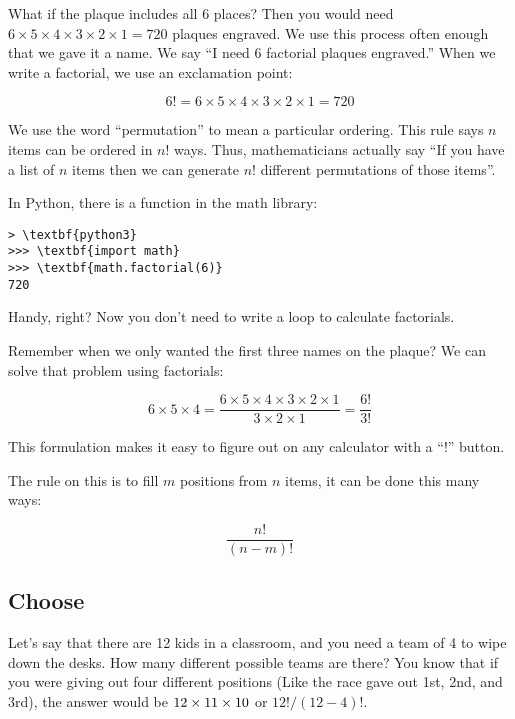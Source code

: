 What if the plaque includes all 6 places?  Then you would need $6 \times 5
\times 4 \times 3 \times 2 \times 1 = 720$ plaques engraved.  We use
this process often enough that we gave it a name.  We say ``I need 6
factorial plaques engraved.''  When we write a factorial, we use an
exclamation point:

$$6! = 6 \times 5 \times 4 \times 3 \times 2 \times 1 = 720$$

We use the word ``permutation'' to mean a particular ordering.
This rule says $n$ items can be ordered in $n!$ ways. Thus,
mathematicians actually say ``If you have a list of $n$ items then we
can generate $n!$ different permutations of those items''.

In Python, there is a  function in the math library:
\begin{Verbatim}[commandchars=\\\{\}]
> \textbf{python3} 
>>> \textbf{import math}
>>> \textbf{math.factorial(6)}
720
\end{Verbatim}

Handy, right? Now you don't need to write a loop to calculate factorials.

Remember when we only wanted the first three names on the plaque? We can solve that problem using factorials:

$$6 \times 5 \times 4 = \frac{6 \times 5 \times 4 \times 3 \times 2 \times 1}{3 \times 2 \times 1} = \frac{6!}{3!}$$

This formulation makes it easy to figure out on any calculator with a ``!'' button.

The rule on this is to fill $m$ positions from $n$ items, it can be done this many ways:

$$\frac{n!}{(n-m)!}$$

\subsection{Choose}

Let's say that there are 12 kids in a classroom, and you need a team
of 4 to wipe down the desks. How many different possible teams are
there? You know that if you were giving out four different positions
(Like the race gave out 1st, 2nd, and 3rd), the answer would be $12
\times 11 \times 10 \time 9$ or $12! / (12 - 4)!$.


